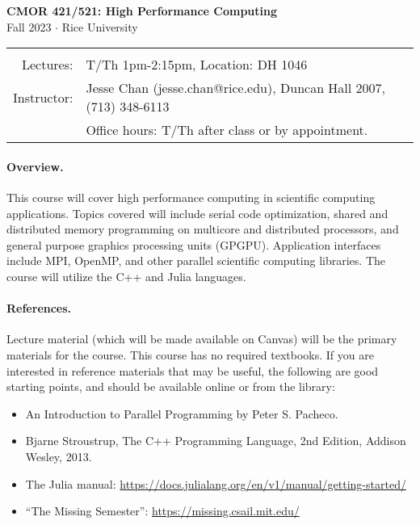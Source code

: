 \documentclass[10pt]{article}
\begin{document}
\vspace*{-5em}
\begin{center}
\large \textbf{CMOR 421/521: High Performance Computing}\\[0.5em]
       {Fall 2023 $\cdot$ Rice University}
\end{center}

\begin{tabular}{rl}
\hline & \\[-.5em]
Lectures:		& T/Th 1pm-2:15pm, Location: DH 1046 \\[.75em]
%
%
Instructor:  	& Jesse Chan (jesse.chan@rice.edu), Duncan Hall 2007, (713) 348-6113 \\
			& Office hours: T/Th after class or by appointment.\\[.5em]
\end{tabular}

\paragraph{Overview.} This course will cover high performance computing in scientific computing applications. Topics covered will include serial code optimization, shared and distributed memory programming on multicore and distributed processors, and general purpose graphics processing units (GPGPU). Application interfaces include MPI, OpenMP, and other parallel scientific computing libraries. The course will utilize the C++ and Julia languages. 

\paragraph{References.} Lecture material (which will be made available on Canvas) will be the primary materials for the course. This course has no required textbooks. If you are interested in reference materials that may be useful, the following are good starting points, and should be available online or from the library:
\begin{itemize}
\setlength\itemsep{.1em}
\item An Introduction to Parallel Programming by Peter S. Pacheco. 
\item Bjarne Stroustrup, The C++ Programming Language, 2nd Edition, Addison Wesley, 2013.
\item The Julia manual: \url{https://docs.julialang.org/en/v1/manual/getting-started/}
\item ``The Missing Semester'': \url{https://missing.csail.mit.edu/}
\end{itemize}
\end{document}
